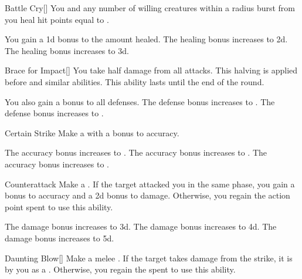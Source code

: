         {
            \begin{apability}{Battle Cry}[]
                You and any number of willing creatures within a \arealarge radius burst from you heal hit points equal to .

                \rankline
                 You gain a \plus1d bonus to the amount healed.
                 The healing bonus increases to \plus2d.
                 The healing bonus increases to \plus3d.
            \end{apability}

            \begin{freeability}{Brace for Impact}[]
                You take half damage from all attacks.
                This halving is applied before  and similar abilities.
                This ability lasts until the end of the round.

                \rankline
                 You also gain a  bonus to all defenses.
                 The defense bonus increases to .
                 The defense bonus increases to .
            \end{freeability}

            \begin{apability}{Certain Strike}
                Make a  with a  bonus to accuracy.

                \rankline
                 The accuracy bonus increases to .
                 The accuracy bonus increases to .
                 The accuracy bonus increases to .
            \end{apability}

            \begin{apability}{Counterattack}
                Make a .
                If the target attacked you in the same phase, you gain a  bonus to accuracy and a \plus2d bonus to damage.
                Otherwise, you regain the action point spent to use this ability.

                \rankline
                 The damage bonus increases to \plus3d.
                 The damage bonus increases to \plus4d.
                 The damage bonus increases to \plus5d.
            \end{apability}

            \begin{apability}{Daunting Blow}[]
                Make a melee .
                If the target takes damage from the strike, it is  by you as a .
                Otherwise, you regain the  spent to use this ability.


\end{apability}}
